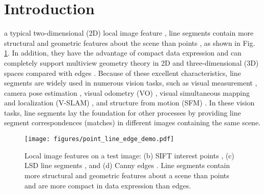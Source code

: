 \documentclass[journal,compsoc]{IEEEtran}
\begin{document}

\section{Introduction}
\label{sec_intro}
 a typical two-dimensional (2D) local image feature \cite{local_feature}, line segments \cite{LSD} contain more structural and geometric features about the scene than points \cite{SIFT,FASTER,8883063}, as shown in Fig. \ref{point_line_edge_demo}. In addition, they have the advantage of compact data expression and can completely support multiview geometry theory \cite{MultipleViewGeometryinComputerVision} in 2D and three-dimensional (3D) spaces compared with edges \cite{Canny,6975234}. Because of these excellent characteristics, line segments are widely used in numerous vision tasks, such as visual measurement \cite{1512061}, camera pose estimation \cite{w-MSAC,our_demo,PoseEstimationfromLineCorrespondencesACompleteAnalysisandaSeriesofSolutions,9969132}, visual odometry (VO) \cite{7898369,8691513}, visual simultaneous mapping and localization (V-SLAM) \cite{6193110,9521742}, and structure from motion (SFM) \cite{8395064}. In these vision tasks, line segments lay the foundation for other processes by providing line segment correspondences (matches) in different images containing the same scene.

\begin{figure}[tbp]
	\centering
	\texttt{[image: figures/point\_line\_edge\_demo.pdf]}
	\caption{Local image features on a test image: (b) SIFT interest points \cite{SIFT}, (c) LSD line segments \cite{LSD}, and (d) Canny edges \cite{Canny}. Line segments contain more structural and geometric features about a scene than points and are more compact in data expression than edges.}
	\label{point_line_edge_demo}
\end{figure}
\end{document}
